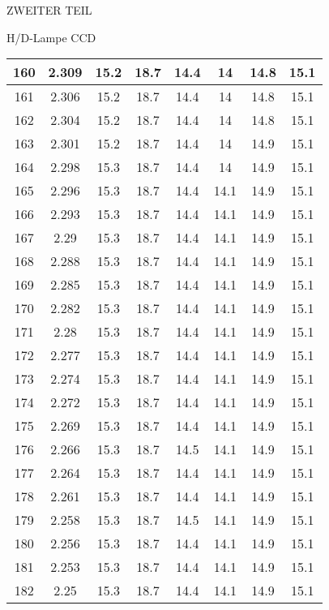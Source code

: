 \begin{appendix}
\begin{chapter}{ZWEITER TEIL}
\begin{section}{H/D-Lampe CCD}
\begin{scriptsize}
\begin{longtable}[htbp]{|c|c|c|c|c|c|c|c|}
            160 & 2.309 & 15.2 & 18.7 & 14.4 & 14 & 14.8 & 15.1 \\ \hline
            161 & 2.306 & 15.2 & 18.7 & 14.4 & 14 & 14.8 & 15.1 \\ \hline
            162 & 2.304 & 15.2 & 18.7 & 14.4 & 14 & 14.8 & 15.1 \\ \hline
            163 & 2.301 & 15.2 & 18.7 & 14.4 & 14 & 14.9 & 15.1 \\ \hline
            164 & 2.298 & 15.3 & 18.7 & 14.4 & 14 & 14.9 & 15.1 \\ \hline
            165 & 2.296 & 15.3 & 18.7 & 14.4 & 14.1 & 14.9 & 15.1 \\ \hline
            166 & 2.293 & 15.3 & 18.7 & 14.4 & 14.1 & 14.9 & 15.1 \\ \hline
            167 & 2.29 & 15.3 & 18.7 & 14.4 & 14.1 & 14.9 & 15.1 \\ \hline
            168 & 2.288 & 15.3 & 18.7 & 14.4 & 14.1 & 14.9 & 15.1 \\ \hline
            169 & 2.285 & 15.3 & 18.7 & 14.4 & 14.1 & 14.9 & 15.1 \\ \hline
            170 & 2.282 & 15.3 & 18.7 & 14.4 & 14.1 & 14.9 & 15.1 \\ \hline
            171 & 2.28 & 15.3 & 18.7 & 14.4 & 14.1 & 14.9 & 15.1 \\ \hline
            172 & 2.277 & 15.3 & 18.7 & 14.4 & 14.1 & 14.9 & 15.1 \\ \hline
            173 & 2.274 & 15.3 & 18.7 & 14.4 & 14.1 & 14.9 & 15.1 \\ \hline
            174 & 2.272 & 15.3 & 18.7 & 14.4 & 14.1 & 14.9 & 15.1 \\ \hline
            175 & 2.269 & 15.3 & 18.7 & 14.4 & 14.1 & 14.9 & 15.1 \\ \hline
            176 & 2.266 & 15.3 & 18.7 & 14.5 & 14.1 & 14.9 & 15.1 \\ \hline
            177 & 2.264 & 15.3 & 18.7 & 14.4 & 14.1 & 14.9 & 15.1 \\ \hline
            178 & 2.261 & 15.3 & 18.7 & 14.4 & 14.1 & 14.9 & 15.1 \\ \hline
            179 & 2.258 & 15.3 & 18.7 & 14.5 & 14.1 & 14.9 & 15.1 \\ \hline
            180 & 2.256 & 15.3 & 18.7 & 14.4 & 14.1 & 14.9 & 15.1 \\ \hline
            181 & 2.253 & 15.3 & 18.7 & 14.4 & 14.1 & 14.9 & 15.1 \\ \hline
            182 & 2.25 & 15.3 & 18.7 & 14.4 & 14.1 & 14.9 & 15.1 \\ \hline

\end{longtable}
\end{scriptsize}
\end{section}
\end{chapter}
\end{appendix}
